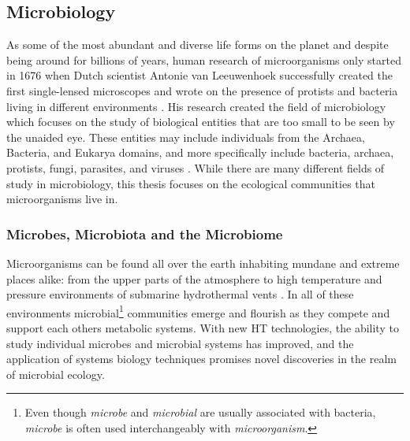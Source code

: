 \subsection{Microbiology}\label{intro-micro}
As some of the most abundant and diverse life forms on the planet and despite being around for billions of years, human research of microorganisms only started in 1676 when Dutch scientist Antonie van Leeuwenhoek successfully created the first single-lensed microscopes and wrote on the presence of protists and bacteria living in different environments \citep{Lane2015}. His research created the field of microbiology which focuses on the study of biological entities that are too small to be seen by the unaided eye. These entities may include individuals from the Archaea, Bacteria, and Eukarya domains, and more specifically include bacteria, archaea, protists, fungi, parasites, and viruses \citep{Sattley2015}. While there are many different fields of study in microbiology, this thesis focuses on the ecological communities that microorganisms live in.

\subsubsection{Microbes, Microbiota and the Microbiome}\label{intro-microbs}
Microorganisms can be found all over the earth inhabiting mundane and extreme places alike: from the upper parts of the atmosphere \citep{Fulton1966}
to high temperature and pressure environments of submarine hydrothermal vents \citep{Anderson2011}. In all of these environments microbial\footnote{Even though \textit{microbe} and \textit{microbial} are usually associated with bacteria, \textit{microbe} is often used interchangeably with \textit{microorganism}.} communities emerge and flourish as they compete and support each others metabolic systems. With new \acrshort{HT} technologies, the ability to study individual microbes and microbial systems has improved, and the application of systems biology techniques promises novel discoveries in the realm of microbial ecology.

